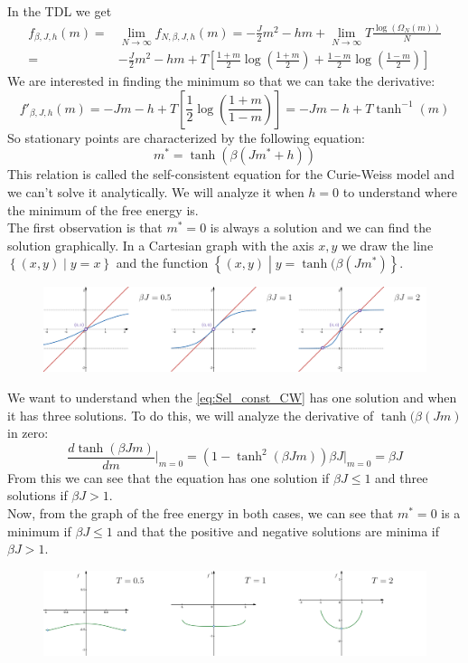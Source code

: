 \noindent In the TDL we get
\begin{align*}
	f_{\beta,J,h}(m) =& \lim_{N\to \infty} f_{N,\beta,J,h}(m) = - \frac{J}{2} m^2 - h m + \lim_{N\to \infty} T \frac{\log(\Omega_N(m))}{N}\\ =& - \frac{J}{2} m^2 - h m + T\left[\frac{1+m}{2} \log\left(\frac{1+m}{2} \right) + \frac{1-m}{2} \log\left(\frac{1-m}{2} \right) \right]
\end{align*}
We are interested in finding the minimum so that we can take the derivative:
\[
f'_{\beta,J,h}(m) = -J m -h + T \left[\frac12 \log\left(\frac{1+m}{1-m} \right) \right] =
-J m -h + T \tanh^{-1}(m)
\]
So stationary points are characterized by the following equation:
\begin{equation}
	\label{eq:Sel_const_CW}
	m^* = \tanh(\beta (Jm^* + h))
\end{equation}
This relation is called the self-consistent equation for the Curie-Weiss model and we can't solve it analytically. We will analyze it when $h=0$ to understand where the minimum of the free energy is. \\
The first observation is that $m^*= 0$ is always a solution and we can find the solution graphically. In a Cartesian graph with the axis $x,y$ we draw the line $\left\{(x,y) \middle| y = x\right\}$ and the function $\left\{(x,y)\middle | y = \tanh(\beta (Jm^*)\right\}$. \\
\begin{figure}[!ht]
    \centering
    \includegraphics[width=1.0\linewidth]{Figures/3graphs.png}
\end{figure}
\bigskip\noindent We want to understand when the \cref{eq:Sel_const_CW} has one solution and when it has three solutions. To do this, we will analyze the derivative of $\tanh(\beta (Jm)$ in zero:
\[
   \frac{d\tanh(\beta Jm)}{dm}\bigg|_{m=0} = (1- \tanh^2(\beta Jm))\beta J \bigg|_{m=0} = \beta J
\]
From this we can see that the equation has one solution if $\beta J \leq 1$ and three solutions if $\beta J> 1$. \\
Now, from the graph of the free energy in both cases, we can see that $m^*= 0$ is a minimum if $\beta J \leq 1$ and that the positive and negative solutions are minima if $\beta J > 1$.\\
\begin{figure}[!ht]
    \centering
    \includegraphics[width=1.0\linewidth]{Figures/3graphsE.png}
\end{figure}

